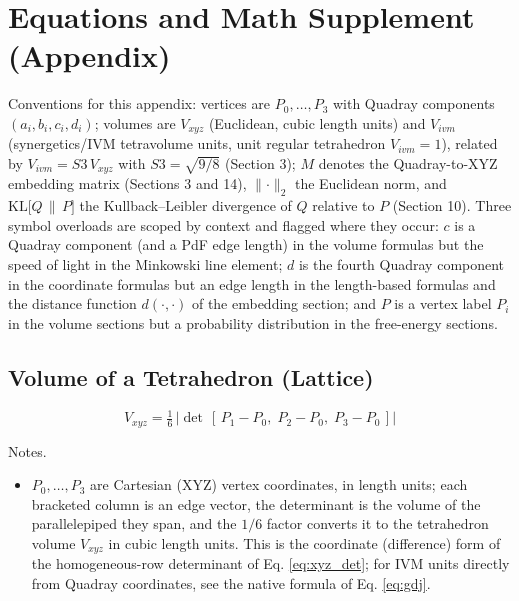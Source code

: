 \documentclass[
  10pt,
]{article}
\providecommand{\tightlist}{%
  \setlength{\itemsep}{0pt}\setlength{\parskip}{0pt}}
\begin{document}
\section{Equations and Math Supplement
(Appendix)}\label{equations-and-math-supplement-appendix}

Conventions for this appendix: vertices are \(P_0,\ldots,P_3\) with
Quadray components \((a_i, b_i, c_i, d_i)\); volumes are \(V_{xyz}\)
(Euclidean, cubic length units) and \(V_{ivm}\) (synergetics/IVM
tetravolume units, unit regular tetrahedron \(V_{ivm} = 1\)), related by
\(V_{ivm} = S3\,V_{xyz}\) with \(S3=\sqrt{9/8}\) (Section 3); \(M\)
denotes the Quadray-to-XYZ embedding matrix (Sections 3 and 14),
\(\lVert\cdot\rVert_2\) the Euclidean norm, and
\(\mathrm{KL}\big[Q\,\|\,P\big]\) the Kullback--Leibler divergence of
\(Q\) relative to \(P\) (Section 10). Three symbol overloads are scoped
by context and flagged where they occur: \(c\) is a Quadray component
(and a PdF edge length) in the volume formulas but the speed of light in
the Minkowski line element; \(d\) is the fourth Quadray component in the
coordinate formulas but an edge length in the length-based formulas and
the distance function \(d(\cdot,\cdot)\) of the embedding section; and
\(P\) is a vertex label \(P_i\) in the volume sections but a probability
distribution in the free-energy sections.

\subsection{Volume of a Tetrahedron
(Lattice)}\label{volume-of-a-tetrahedron-lattice}

\begin{equation}\label{eq:lattice_det}
V_{xyz} = \tfrac{1}{6}\,\left|\det\,[\,P_1 - P_0,\; P_2 - P_0,\; P_3 - P_0\,]\right|
\end{equation}

Notes.

\begin{itemize}
\tightlist
\item
  \(P_0,\ldots,P_3\) are Cartesian (XYZ) vertex coordinates, in length
  units; each bracketed column is an edge vector, the determinant is the
  volume of the parallelepiped they span, and the \(1/6\) factor
  converts it to the tetrahedron volume \(V_{xyz}\) in cubic length
  units. This is the coordinate (difference) form of the homogeneous-row
  determinant of Eq. \eqref{eq:xyz_det}; for IVM units directly from
  Quadray coordinates, see the native formula of Eq. \eqref{eq:gdj}.
\end{itemize}
\end{document}
